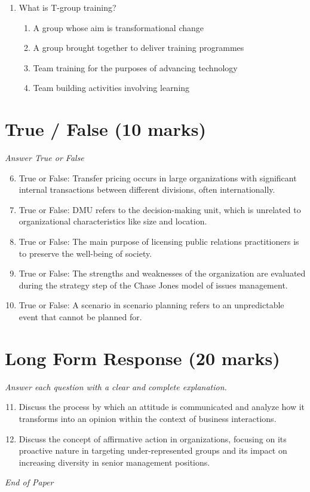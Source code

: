 \documentclass[12pt]{article}
\begin{document}
\begin{enumerate}[label=\arabic*.]
\begin{enumerate}[label=(\alph*)]
    \item Convenience.
\end{enumerate}
\item What is T-group training?
\begin{enumerate}[label=(\alph*)]
    \item A group whose aim is transformational change
    \item A group brought together to deliver training programmes
    \item Team training for the purposes of advancing technology
    \item Team building activities involving learning
\end{enumerate}
\end{enumerate}

\section*{True / False (10 marks)}
\textit{Answer True or False}
\begin{enumerate}[label=\arabic*.]
\setcounter{enumi}{5}
\item True or False: Transfer pricing occurs in large organizations with significant internal transactions between different divisions, often internationally.
\item True or False: DMU refers to the decision-making unit, which is unrelated to organizational characteristics like size and location.
\item True or False: The main purpose of licensing public relations practitioners is to preserve the well-being of society.
\item True or False: The strengths and weaknesses of the organization are evaluated during the strategy step of the Chase Jones model of issues management.
\item True or False: A scenario in scenario planning refers to an unpredictable event that cannot be planned for.
\end{enumerate}

\section*{Long Form Response (20 marks)}
\textit{Answer each question with a clear and complete explanation.}
\begin{enumerate}[label=\arabic*.]
\setcounter{enumi}{10}
\item Discuss the process by which an attitude is communicated and analyze how it transforms into an opinion within the context of business interactions.
\item Discuss the concept of affirmative action in organizations, focusing on its proactive nature in targeting under-represented groups and its impact on increasing diversity in senior management positions.
\end{enumerate}

\vfill
\noindent\textit{End of Paper}
\end{document}
